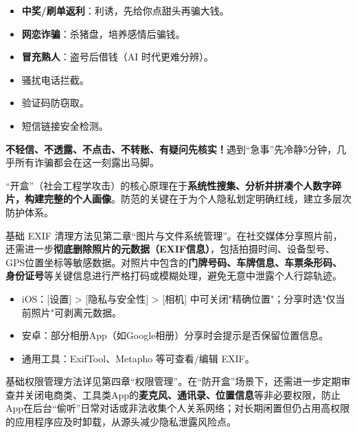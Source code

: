 
\begin{itemize}
  \item \textbf{中奖/刷单返利}：利诱，先给你点甜头再骗大钱。
  \item \textbf{网恋诈骗}：杀猪盘，培养感情后骗钱。
  \item \textbf{冒充熟人}：盗号后借钱（AI 时代更难分辨）。
\end{itemize}


\begin{itemize}
  \item 骚扰电话拦截。
  \item 验证码防窃取。
  \item 短信链接安全检测。
\end{itemize}


\textbf{不轻信、不透露、不点击、不转账、有疑问先核实！}遇到“急事”先冷静5分钟，几乎所有诈骗都会在这一刻露出马脚。


“开盒”（社会工程学攻击）的核心原理在于\textbf{系统性搜集、分析并拼凑个人数字碎片，构建完整的个人画像}。防范的关键在于为个人隐私划定明确红线，建立多层次防护体系。


基础 EXIF 清理方法见第二章“图片与文件系统管理”。在社交媒体分享照片前，还需进一步\textbf{彻底删除照片的元数据（EXIF信息）}，包括拍摄时间、设备型号、GPS位置坐标等敏感数据。对照片中包含的\textbf{门牌号码、车牌信息、车票条形码、身份证号}等关键信息进行严格打码或模糊处理，避免无意中泄露个人行踪轨迹。

\begin{itemize}
  \item iOS：[设置] > [隐私与安全性] > [相机] 中可关闭"精确位置"；分享时选"仅当前照片"可剥离元数据。
  \item 安卓：部分相册App（如Google相册）分享时会提示是否保留位置信息。
  \item 通用工具：ExifTool、Metapho 等可查看/编辑 EXIF。
\end{itemize}


基础权限管理方法详见第四章“权限管理”。在“防开盒”场景下，还需进一步定期审查并关闭电商类、工具类App的\textbf{麦克风、通讯录、位置信息}等非必要权限，防止App在后台“偷听”日常对话或非法收集个人关系网络；对长期闲置但仍占用高权限的应用程序应及时卸载，从源头减少隐私泄露风险点。

